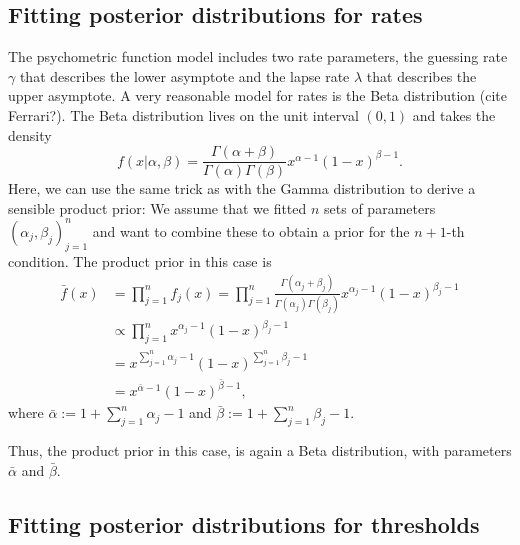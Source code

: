 \documentclass[a4paper,11pt]{scrartcl}
\begin{document}
\subsection{Fitting posterior distributions for rates}

The psychometric function model includes two rate parameters, the guessing rate $\gamma$ that describes the lower asymptote and the lapse rate $\lambda$ that describes the upper asymptote.
A very reasonable model for rates is the Beta distribution (cite Ferrari?).
The Beta distribution lives on the unit interval $(0,1)$ and takes the density
%
\begin{equation}
    f ( x | \alpha, \beta ) = \frac{\Gamma(\alpha+\beta)}{\Gamma(\alpha)\Gamma(\beta)} x^{\alpha-1} (1-x)^{\beta-1}.
    \label{eq:BetaDensity}
\end{equation}
%
Here, we can use the same trick as with the Gamma distribution to derive a sensible product prior:
We assume that we fitted $n$ sets of parameters $(\alpha_j,\beta_j)_{j=1}^n$ and want to combine these to obtain a prior for the $n+1$-th condition.
The product prior in this case is
%
\begin{align*}
    \bar{f}(x) &= \prod_{j=1}^n f_j(x) = \prod_{j=1}^n \frac{\Gamma(\alpha_j+\beta_j)}{\Gamma(\alpha_j)\Gamma(\beta_j)} x^{\alpha_j-1} (1-x)^{\beta_j-1}\\
    &\propto \prod_{j=1}^n x^{\alpha_j-1} (1-x)^{\beta_j-1} \\
    &= x^{\sum_{j=1}^n \alpha_j-1} (1-x)^{\sum_{j=1}^n\beta_j-1} \\
    &= x^{\bar{\alpha}-1} (1-x)^{\bar{\beta}-1},
\end{align*}
%
where $\bar{\alpha}:= 1+ \sum_{j=1}^n\alpha_j-1$ and $\bar{\beta}:=1+\sum_{j=1}^n\beta_j-1$.

Thus, the product prior in this case, is again a Beta distribution, with parameters $\bar{\alpha}$ and $\bar{\beta}$.

\subsection{Fitting posterior distributions for thresholds}
\end{document}

